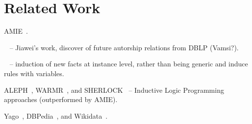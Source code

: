 \section{Related Work}
AMIE~\cite{galarraga2015fast}.

~\cite{zhu2011mining} -- Jiawei's work, discover of future autorship relations from DBLP (Vamsi?).

~\cite{abedjan2014amending} -- induction of new facts at instance level, rather than being generic and induce rules with variables.

ALEPH~\cite{muggleton1995inverse}, WARMR~\cite{dehaspe1999discovery}, and SHERLOCK~\cite{schoenmackers2010learning} -- Inductive Logic Programming approaches (outperformed by AMIE).

Yago~\cite{suchanek2007yago}, DBPedia~\cite{bizer2009dbpedia}, and Wikidata~\cite{vrandevcic2014wikidata}.